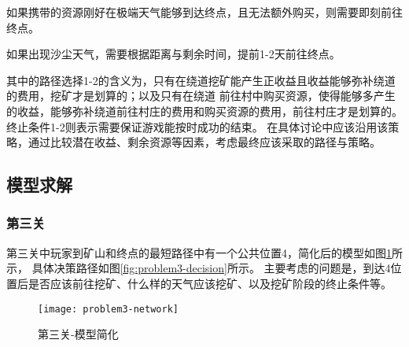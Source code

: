 \documentclass[withoutpreface,bwprint]{cumcmthesis} %
\begin{document}
\begin{decisionend}
    如果携带的资源刚好在极端天气能够到达终点，且无法额外购买，则需要即刻前往终点。
    \label{deci:day1}
\end{decisionend}

\begin{decisionend}
    如果出现沙尘天气，需要根据距离与剩余时间，提前1-2天前往终点。
    \label{deci:day2}
\end{decisionend}

其中的路径选择1-2的含义为，只有在绕道挖矿能产生正收益且收益能够弥补绕道的费用，挖矿才是划算的；以及只有在绕道
前往村中购买资源，使得能够多产生的收益，能够弥补绕道前往村庄的费用和购买资源的费用，前往村庄才是划算的。
终止条件1-2则表示需要保证游戏能按时成功的结束。
在具体讨论中应该沿用该策略，通过比较潜在收益、剩余资源等因素，考虑最终应该采取的路径与策略。







\subsection{模型求解}

\subsubsection{第三关}

第三关中玩家到矿山和终点的最短路径中有一个公共位置4，简化后的模型如图\ref{fig:problem3-network}所示，
具体决策路径如图\ref{fig:problem3-decision}所示。
主要考虑的问题是，到达4位置后是否应该前往挖矿、什么样的天气应该挖矿、以及挖矿阶段的终止条件等。

\begin{figure}[!h]
    \centering
    \texttt{[image: problem3-network]}
    \caption{第三关-模型简化}
    \label{fig:problem3-network}
\end{figure}
\end{document}
